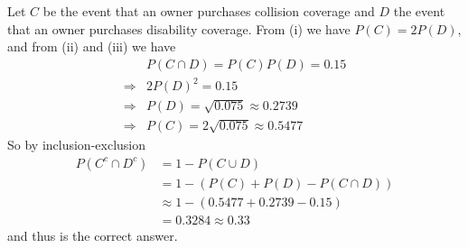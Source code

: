 \documentclass{exam}
\begin{document}
\begin{oneparchoices}
\end{oneparchoices}
\begin{solution}
    Let $C$ be the event that an owner purchases collision coverage and $D$ the event that an owner purchases disability coverage. From (i) we have $P(C) = 2P(D)$, and from (ii) and (iii) we have
    \begin{align*}
        &P(C \cap D) = P(C)P(D) = 0.15 \\
        \Rightarrow& 2P(D)^2 = 0.15 \\
        \Rightarrow& P(D) = \sqrt{0.075} \approx 0.2739 \\
        \Rightarrow& P(C) = 2\sqrt{0.075} \approx 0.5477
    \end{align*}
    So by inclusion-exclusion
    \begin{align*}
        P(C^c \cap D^c) &= 1 - P(C \cup D) \\
        &= 1 - \left(P(C) + P(D) - P(C \cap D)\right) \\
        &\approx 1 - (0.5477 + 0.2739 - 0.15) \\
        &= \boxed{0.3284 \approx 0.33}
    \end{align*}
    and thus  is the correct answer.
\end{solution}
\end{document}

